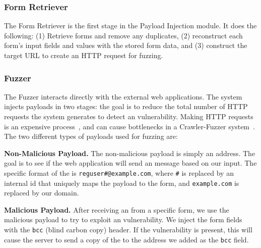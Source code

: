 

\subsubsection{\Email Form Retriever}
\label{Comp:EMFR}
The \Email Form Retriever is the first stage in the Payload Injection
module. It does the following: (1) Retrieve forms and
remove any duplicates, (2) reconstruct
each form's input fields
and values with the stored form data, and (3) construct the target URL
to create an HTTP request for fuzzing.


\subsubsection{Fuzzer}
\label{Comp:Fuzzer}
The Fuzzer interacts directly with the external web applications. The system injects payloads in two stages: the goal is to reduce the total number of HTTP requests the system generates to detect an \ehi vulnerability. Making HTTP requests is an expensive process~\cite{httpperf}, and can cause bottlenecks in a Crawler-Fuzzer system~\cite{ShkapenyukTorstenSuel2001}.
The two different types of payloads used for fuzzing are:

\noindent\textbf{Non-Malicious Payload.}
The non-malicious payload is simply an \email address. The goal is to see if the web application will send an \email message based on our input. The specific format of the \email is \lstinline|reguser#@example.com|, where \texttt{\#} is replaced by an internal id that uniquely maps the payload to the form, and \texttt{example.com} is replaced by our domain.

\noindent\textbf{Malicious Payload.}
After receiving an \email from a specific form, we use the malicious payload to try to exploit an \ehi vulnerability. We inject the form fields with the \texttt{bcc} (blind carbon copy) header. If the vulnerability is present, this will cause the server to send a copy of the \email to the \email address we added as the \texttt{bcc} field.


